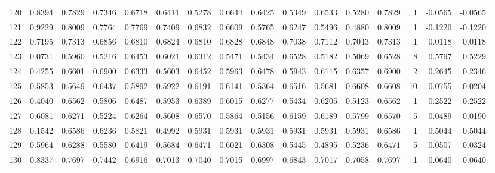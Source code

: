 \begin{tabular}{lrrrrrrrrrrrrrrr}
120 &      0.8394 &  0.7829 &  0.7346 &  0.6718 &  0.6411 &  0.5278 &  0.6644 &  0.6425 &  0.5349 &  0.6533 &   0.5280 &     0.7829 &      1 &                   -0.0565 &                    -0.0565 \\
121 &      0.9229 &  0.8009 &  0.7764 &  0.7769 &  0.7409 &  0.6832 &  0.6609 &  0.5765 &  0.6247 &  0.5496 &   0.4880 &     0.8009 &      1 &                   -0.1220 &                    -0.1220 \\
122 &      0.7195 &  0.7313 &  0.6856 &  0.6810 &  0.6824 &  0.6810 &  0.6828 &  0.6848 &  0.7038 &  0.7112 &   0.7043 &     0.7313 &      1 &                    0.0118 &                     0.0118 \\
123 &      0.0731 &  0.5960 &  0.5216 &  0.6453 &  0.6021 &  0.6312 &  0.5471 &  0.5434 &  0.6528 &  0.5182 &   0.5069 &     0.6528 &      8 &                    0.5797 &                     0.5229 \\
124 &      0.4255 &  0.6601 &  0.6900 &  0.6333 &  0.5603 &  0.6452 &  0.5963 &  0.6478 &  0.5943 &  0.6115 &   0.6357 &     0.6900 &      2 &                    0.2645 &                     0.2346 \\
125 &      0.5853 &  0.5649 &  0.6437 &  0.5892 &  0.5922 &  0.6191 &  0.6141 &  0.5364 &  0.6516 &  0.5681 &   0.6608 &     0.6608 &     10 &                    0.0755 &                    -0.0204 \\
126 &      0.4040 &  0.6562 &  0.5806 &  0.6487 &  0.5953 &  0.6389 &  0.6015 &  0.6277 &  0.5434 &  0.6205 &   0.5123 &     0.6562 &      1 &                    0.2522 &                     0.2522 \\
127 &      0.6081 &  0.6271 &  0.5224 &  0.6264 &  0.5608 &  0.6570 &  0.5864 &  0.5156 &  0.6159 &  0.6189 &   0.5799 &     0.6570 &      5 &                    0.0489 &                     0.0190 \\
128 &      0.1542 &  0.6586 &  0.6236 &  0.5821 &  0.4992 &  0.5931 &  0.5931 &  0.5931 &  0.5931 &  0.5931 &   0.5931 &     0.6586 &      1 &                    0.5044 &                     0.5044 \\
129 &      0.5964 &  0.6288 &  0.5580 &  0.6419 &  0.5684 &  0.6471 &  0.6021 &  0.6308 &  0.5445 &  0.4895 &   0.5236 &     0.6471 &      5 &                    0.0507 &                     0.0324 \\
130 &      0.8337 &  0.7697 &  0.7442 &  0.6916 &  0.7013 &  0.7040 &  0.7015 &  0.6997 &  0.6843 &  0.7017 &   0.7058 &     0.7697 &      1 &                   -0.0640 &                    -0.0640 \\

\end{tabular}
